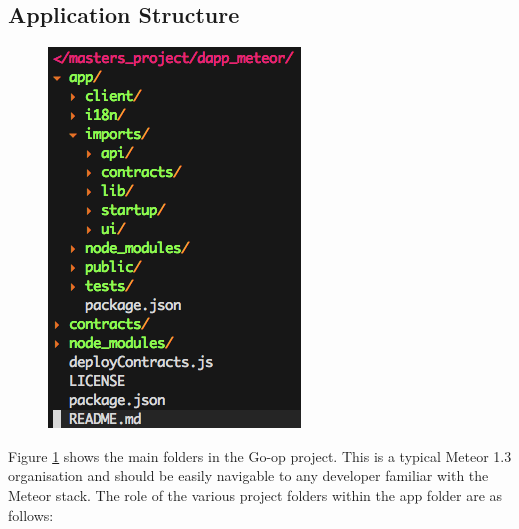 \subsection{Application Structure}
\begin{figure}
\centering
\includegraphics[width=\textwidth]{Figures/AppStructure}
\decoRule
\caption[]{ }
\label{fig:AppStructure}
\end{figure}

Figure \ref{fig:AppStructure} shows the main folders in the Go-op project. This is a typical Meteor 1.3 organisation and should be easily navigable to any developer familiar with the Meteor stack. The role of the various project folders within the app folder are as follows: \\

